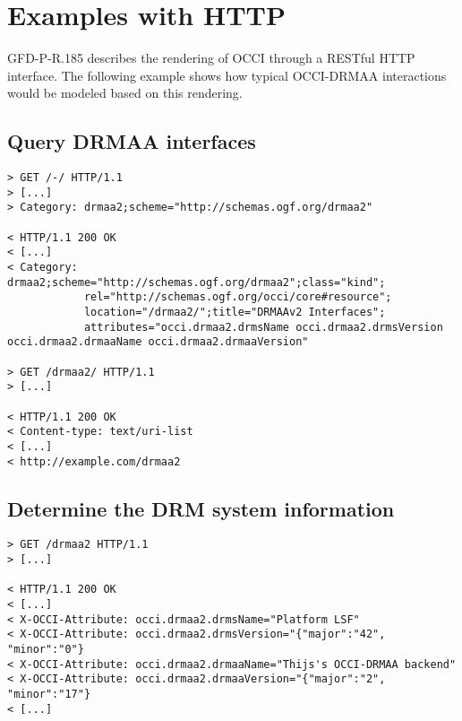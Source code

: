 \documentclass[10pt]{article}
\newcommand{\rat}[1]{}
\begin{document}
\rat{DRMAA makes no statements on mandatory attributes in the filtering case, so we make all mixin attributes optional. On the other hand, this makes job information reporting more flexible than it should be. For example, an implementation could decide to not report allocatedMachines as job information, which is a violation of the DRMAA spec.}



\section{Examples with HTTP}

GFD-P-R.185 \cite{gfd185} describes the rendering of OCCI through a RESTful HTTP interface. The following example shows how typical OCCI-DRMAA interactions would be modeled based on this rendering.

\subsection{Query DRMAA interfaces}
\label{sec:sessionmanager}

\begin{verbatim}
> GET /-/ HTTP/1.1
> [...]
> Category: drmaa2;scheme="http://schemas.ogf.org/drmaa2" 

< HTTP/1.1 200 OK 
< [...]
< Category: drmaa2;scheme="http://schemas.ogf.org/drmaa2";class="kind";
			rel="http://schemas.ogf.org/occi/core#resource";
            location="/drmaa2/";title="DRMAAv2 Interfaces";
            attributes="occi.drmaa2.drmsName occi.drmaa2.drmsVersion occi.drmaa2.drmaaName occi.drmaa2.drmaaVersion"

> GET /drmaa2/ HTTP/1.1
> [...]

< HTTP/1.1 200 OK 
< Content-type: text/uri-list
< [...]
< http://example.com/drmaa2
\end{verbatim}

\subsection{Determine the DRM system information}
             
\begin{verbatim}
> GET /drmaa2 HTTP/1.1
> [...]

< HTTP/1.1 200 OK 
< [...]
< X-OCCI-Attribute: occi.drmaa2.drmsName="Platform LSF"
< X-OCCI-Attribute: occi.drmaa2.drmsVersion="{"major":"42", "minor":"0"} 
< X-OCCI-Attribute: occi.drmaa2.drmaaName="Thijs's OCCI-DRMAA backend"
< X-OCCI-Attribute: occi.drmaa2.drmaaVersion="{"major":"2", "minor":"17"} 
< [...]
\end{verbatim}
\end{document}
